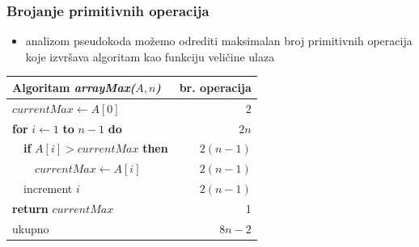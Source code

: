 \documentclass[compress,aspectratio=169]{beamer}
\begin{document}
\begin{frame}[fragile]
  \frametitle{Brojanje primitivnih operacija}
  \begin{itemize}
    \item analizom pseudokoda možemo odrediti maksimalan broj primitivnih
    operacija koje izvršava algoritam kao funkciju veličine ulaza
  \end{itemize}
  \begin{center}
    \begin{tabular}{l|r}
      \textbf{Algoritam} \textit{arrayMax($A, n$)} & \textbf{br. operacija} \\ \hline
      $currentMax \leftarrow A[0]$ & $2$ \\
      \textbf{for} $i \leftarrow 1$ \textbf{to} $n - 1$ \textbf{do} & $2n$ \\
      \ \ \textbf{if} $A[i] > currentMax$ \textbf{then} & $2(n-1)$ \\
      \ \ \ \ $currentMax \leftarrow A[i]$ & $2(n-1)$ \\
      \ \ increment $i$ & $2(n-1)$ \\
      \textbf{return} $currentMax$ & 1 \\ \hline
      \hfill ukupno & $8n-2$
    \end{tabular}
  \end{center}
\end{frame}
\end{document}
